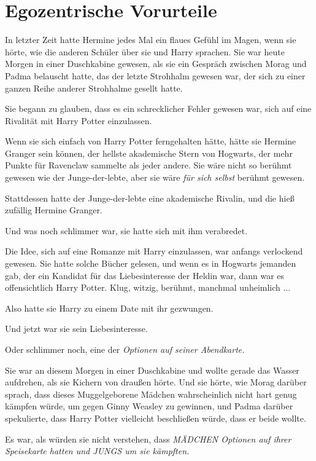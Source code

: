 \chapter{Egozentrische Vorurteile}

In letzter Zeit hatte Hermine jedes Mal ein flaues Gefühl im Magen, wenn sie
hörte, wie die anderen Schüler über sie und Harry sprachen. Sie war heute Morgen
in einer Duschkabine gewesen, als sie ein Gespräch zwischen Morag und Padma
belauscht hatte, das der letzte Strohhalm gewesen war, der sich zu einer ganzen
Reihe anderer Strohhalme gesellt hatte.

Sie begann zu glauben, dass es ein schrecklicher Fehler gewesen war, sich auf
eine Rivalität mit Harry Potter einzulassen.

Wenn sie sich einfach von Harry Potter ferngehalten hätte, hätte sie Hermine
Granger sein können, der hellste akademische Stern von Hogwarts, der mehr Punkte
für Ravenclaw sammelte als jeder andere. Sie wäre nicht so berühmt gewesen wie
der Junge-der-lebte, aber sie wäre\emph{ für sich selbst} berühmt gewesen.

Stattdessen hatte der Junge-der-lebte eine akademische Rivalin, und die hieß
zufällig Hermine Granger.

Und was noch schlimmer war, sie hatte sich mit ihm verabredet.

Die Idee, sich auf eine Romanze mit Harry einzulassen, war anfangs verlockend
gewesen. Sie hatte solche Bücher gelesen, und wenn es in Hogwarts jemanden gab,
der ein Kandidat für das Liebesinteresse der Heldin war, dann war es
offensichtlich Harry Potter. Klug, witzig, berühmt, manchmal unheimlich ...

Also hatte sie Harry zu einem Date mit ihr gezwungen.

Und jetzt war sie sein Liebesinteresse.

Oder schlimmer noch, eine der \emph{Optionen auf seiner Abendkarte.}

Sie war an diesem Morgen in einer Duschkabine und wollte gerade das Wasser
aufdrehen, als sie Kichern von draußen hörte. Und sie hörte, wie Morag darüber
sprach, dass dieses Muggelgeborene Mädchen wahrscheinlich nicht hart genug
kämpfen würde, um gegen Ginny Weasley zu gewinnen, und Padma darüber
spekulierte, dass Harry Potter vielleicht beschließen würde, dass er beide
wollte.

Es war, als würden sie nicht verstehen, dass \emph{MÄDCHEN Optionen auf ihrer
Speisekarte hatten und JUNGS um sie kämpften.}

